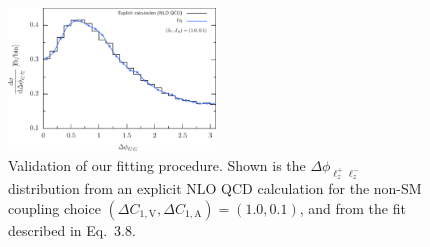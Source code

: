 \documentclass[preprint]{JHEP3}
\def\DConeA{\Delta C_{1,\mathrm{A}}}
\def\DConeV{\Delta C_{1,\mathrm{V}}}
\begin{document}
\begin{figure}[t]
\centering %
\includegraphics[width=0.49\textwidth]{./LHC_53_Fig17d.eps}
\caption{\label{fig:iv} Validation of our fitting procedure. Shown is the $\Delta \phi_{\ell^+_z \ell^-_z}$ distribution from an explicit NLO QCD calculation 
for the non-SM coupling choice $(\DConeV,\DConeA)=(1.0,0.1)$, and from the fit described in Eq.~3.8. }
\end{figure}
\end{document}
